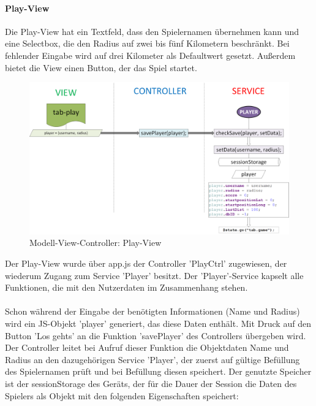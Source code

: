 \paragraph{Play-View}
%
%
Die Play-View hat ein Textfeld, dass den Spielernamen übernehmen kann und eine Selectbox, die den Radius auf zwei bis fünf Kilometern beschränkt. Bei fehlender Eingabe wird auf drei Kilometer als Defaultwert gesetzt. Außerdem bietet die View einen Button, der das Spiel startet. 
%
%
\begin{figure}[h]
\centering
\includegraphics[width=1\textwidth]{ref/images/02-play-tab.png}
\caption[Modell-View-Controller: Play-View]{Modell-View-Controller: Play-View}
\label{fig:MVC:Play-View}
\end{figure}
%
%
Der Play-View wurde über app.js der Controller 'PlayCtrl' zugewiesen, der wiederum Zugang zum Service 'Player' besitzt. Der 'Player'-Service kapselt alle Funktionen, die mit den Nutzerdaten im Zusammenhang stehen.
\\
\\
Schon während der Eingabe der benötigten Informationen (Name und Radius) wird ein JS-Objekt 'player' generiert, das diese Daten enthält. Mit Druck auf den Button 'Los gehts' an die Funktion 'savePlayer' des Controllers übergeben wird. 
\\
Der Controller leitet bei Aufruf dieser Funktion die Objektdaten Name und Radius an den dazugehörigen Service 'Player', der zuerst auf gültige Befüllung des Spielernamen prüft und bei Befüllung diesen speichert. Der genutzte Speicher ist der sessionStorage des Geräts, der für die Dauer der Session die Daten des Spielers als Objekt mit den folgenden Eigenschaften speichert: 
